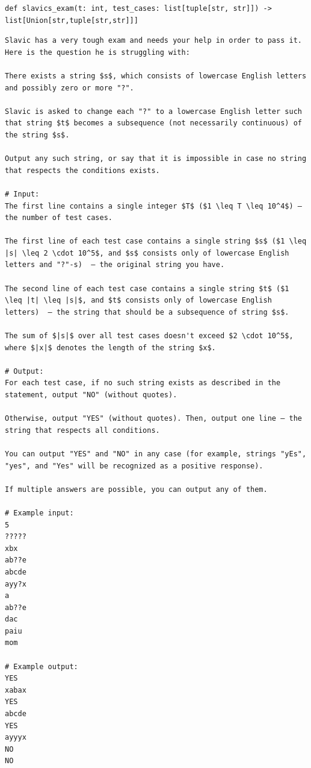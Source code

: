 \documentclass[acmsmall,screen,nonacm]{acmart}
\begin{document}
{\scriptsize
\begin{tcolorbox}[mybox,breakable,title={Original problem 1999D from CodeElo}]
\begin{verbatim}
def slavics_exam(t: int, test_cases: list[tuple[str, str]]) -> list[Union[str,tuple[str,str]]]
\end{verbatim}
\begin{verbatim}
Slavic has a very tough exam and needs your help in order to pass it. Here is the question he is struggling with:

There exists a string $s$, which consists of lowercase English letters and possibly zero or more "?".

Slavic is asked to change each "?" to a lowercase English letter such that string $t$ becomes a subsequence (not necessarily continuous) of the string $s$.

Output any such string, or say that it is impossible in case no string that respects the conditions exists.

# Input:
The first line contains a single integer $T$ ($1 \leq T \leq 10^4$) — the number of test cases.

The first line of each test case contains a single string $s$ ($1 \leq |s| \leq 2 \cdot 10^5$, and $s$ consists only of lowercase English letters and "?"-s)  – the original string you have.

The second line of each test case contains a single string $t$ ($1 \leq |t| \leq |s|$, and $t$ consists only of lowercase English letters)  – the string that should be a subsequence of string $s$.

The sum of $|s|$ over all test cases doesn't exceed $2 \cdot 10^5$, where $|x|$ denotes the length of the string $x$.

# Output:
For each test case, if no such string exists as described in the statement, output "NO" (without quotes).

Otherwise, output "YES" (without quotes). Then, output one line — the string that respects all conditions.

You can output "YES" and "NO" in any case (for example, strings "yEs", "yes", and "Yes" will be recognized as a positive response).

If multiple answers are possible, you can output any of them.

# Example input:
5
?????
xbx
ab??e
abcde
ayy?x
a
ab??e
dac
paiu
mom

# Example output:
YES
xabax
YES
abcde
YES
ayyyx
NO
NO
\end{verbatim}
\end{tcolorbox}
}
\end{document}
